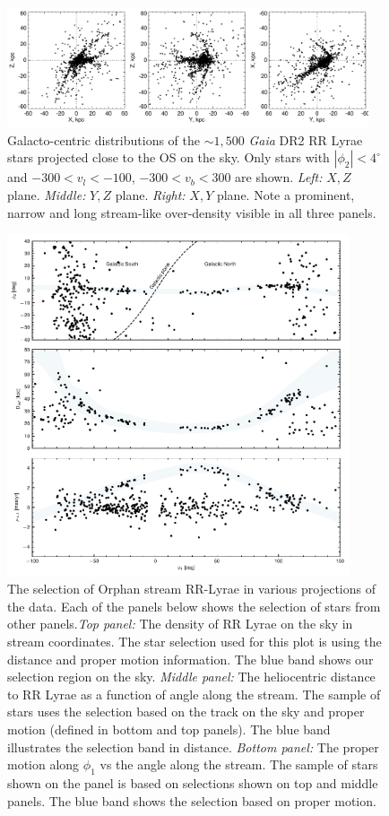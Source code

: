 \documentclass[a4paper,useAMS,usenatbib]{mnras}
\newcommand{\gaia}{\textit{Gaia} }
\begin{document}
%
\begin{figure}
  \centering
  \includegraphics[width=0.95\textwidth]{orphan_paper_xyz.pdf}
  \caption[]{Galacto-centric distributions of the $\sim1,500$ \gaia
    DR2 RR Lyrae stars projected close to the OS on the sky. Only
    stars with $|\phi_2|<4^{\circ}$ and $-300<v_l <-100$, $-300<v_b
    <300$ are shown. {\it Left:} $X,Z$ plane. {\it Middle:} $Y,Z$
    plane. {\it Right:} $X,Y$ plane. Note a prominent, narrow and long
    stream-like over-density visible in all three panels.}
   \label{fig:xyzgdr2}
\end{figure}
%


%
\begin{figure}
  \centering
  \includegraphics[width=0.9\textwidth]{rrlyrae_selection_plot.pdf}
  \caption[]{The selection of Orphan stream RR-Lyrae in various projections of the data. Each of the panels below shows the selection of stars from other panels.{\it Top panel:} The density of RR Lyrae on the sky in stream coordinates. The star selection used for this plot is using the distance and proper motion information. The blue band shows our selection region on the sky. {\it Middle panel:} The heliocentric distance to RR Lyrae as a function of angle along the stream. The sample of stars uses the selection based on the track on the sky and proper motion (defined in bottom and top panels). The blue band illustrates the selection band in distance. {\it Bottom panel:} The proper motion along $\phi_1$ vs the angle along the stream. The sample of stars shown on the panel is based on selections shown on top and middle panels. The blue band shows the selection based on proper motion.  }
   \label{fig:selection}
\end{figure}
%
\end{document}
